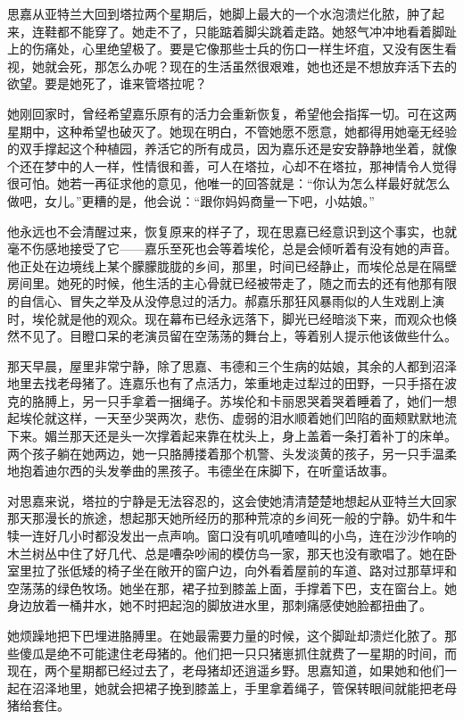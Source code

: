 \par 思嘉从亚特兰大回到塔拉两个星期后，她脚上最大的一个水泡溃烂化脓，肿了起来，连鞋都不能穿了。她走不了，只能踮着脚尖跳着走路。她怒气冲冲地看着脚趾上的伤痛处，心里绝望极了。要是它像那些士兵的伤口一样生坏疽，又没有医生看视，她就会死，那怎么办呢？现在的生活虽然很艰难，她也还是不想放弃活下去的欲望。要是她死了，谁来管塔拉呢？
\par 她刚回家时，曾经希望嘉乐原有的活力会重新恢复，希望他会指挥一切。可在这两星期中，这种希望也破灭了。她现在明白，不管她愿不愿意，她都得用她毫无经验的双手撑起这个种植园，养活它的所有成员，因为嘉乐还是安安静静地坐着，就像个还在梦中的人一样，性情很和善，可人在塔拉，心却不在塔拉，那神情令人觉得很可怕。她若一再征求他的意见，他唯一的回答就是：“你认为怎么样最好就怎么做吧，女儿。”更糟的是，他会说：“跟你妈妈商量一下吧，小姑娘。”
\par 他永远也不会清醒过来，恢复原来的样子了，现在思嘉已经意识到这个事实，也就毫不伤感地接受了它——嘉乐至死也会等着埃伦，总是会倾听着有没有她的声音。他正处在边境线上某个朦朦胧胧的乡间，那里，时间已经静止，而埃伦总是在隔壁房间里。她死的时候，他生活的主心骨就已经被带走了，随之而去的还有他那有限的自信心、冒失之举及从没停息过的活力。郝嘉乐那狂风暴雨似的人生戏剧上演时，埃伦就是他的观众。现在幕布已经永远落下，脚光已经暗淡下来，而观众也倏然不见了。目瞪口呆的老演员留在空荡荡的舞台上，等着别人提示他该做些什么。
\par 那天早晨，屋里非常宁静，除了思嘉、韦德和三个生病的姑娘，其余的人都到沼泽地里去找老母猪了。连嘉乐也有了点活力，笨重地走过犁过的田野，一只手搭在波克的胳膊上，另一只手拿着一捆绳子。苏埃伦和卡丽恩哭着哭着睡着了，她们一想起埃伦就这样，一天至少哭两次，悲伤、虚弱的泪水顺着她们凹陷的面颊默默地流下来。媚兰那天还是头一次撑着起来靠在枕头上，身上盖着一条打着补丁的床单。两个孩子躺在她两边，她一只胳膊搂着那个机警、头发淡黄的孩子，另一只手温柔地抱着迪尔西的头发拳曲的黑孩子。韦德坐在床脚下，在听童话故事。
\par 对思嘉来说，塔拉的宁静是无法容忍的，这会使她清清楚楚地想起从亚特兰大回家那天那漫长的旅途，想起那天她所经历的那种荒凉的乡间死一般的宁静。奶牛和牛犊一连好几小时都没发出一点声响。窗口没有叽叽喳喳叫的小鸟，连在沙沙作响的木兰树丛中住了好几代、总是嘈杂吵闹的模仿鸟一家，那天也没有歌唱了。她在卧室里拉了张低矮的椅子坐在敞开的窗户边，向外看着屋前的车道、路对过那草坪和空荡荡的绿色牧场。她坐在那，裙子拉到膝盖上面，手撑着下巴，支在窗台上。她身边放着一桶井水，她不时把起泡的脚放进水里，那刺痛感使她脸都扭曲了。
\par 她烦躁地把下巴埋进胳膊里。在她最需要力量的时候，这个脚趾却溃烂化脓了。那些傻瓜是绝不可能逮住老母猪的。他们把一只只猪崽抓住就费了一星期的时间，而现在，两个星期都已经过去了，老母猪却还逍遥乡野。思嘉知道，如果她和他们一起在沼泽地里，她就会把裙子挽到膝盖上，手里拿着绳子，管保转眼间就能把老母猪给套住。
